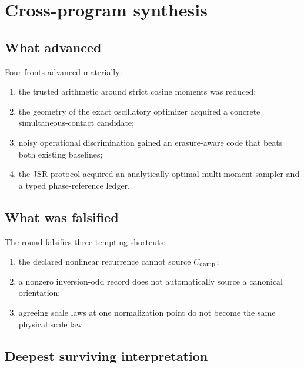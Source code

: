 \documentclass[11pt,a4paper,openany]{report}
\begin{document}
\chapter{Cross-program synthesis}

\section{What advanced}

Four fronts advanced materially:

\begin{enumerate}
\item 
the trusted arithmetic around strict cosine moments was reduced;

\item 
the geometry of the exact oscillatory optimizer acquired a concrete simultaneous-contact candidate;

\item 
noisy operational discrimination gained an erasure-aware code that beats both existing baselines;

\item 
the JSR protocol acquired an analytically optimal multi-moment sampler and a typed phase-reference ledger.

\end{enumerate}

\section{What was falsified}

The round falsifies three tempting shortcuts:

\begin{enumerate}
\item 
the declared nonlinear recurrence cannot source \(C_{\rm damp}\);

\item 
a nonzero inversion-odd record does not automatically source a canonical orientation;

\item 
agreeing scale laws at one normalization point do not become the same physical scale law.

\end{enumerate}

\section{Deepest surviving interpretation}
\end{document}
